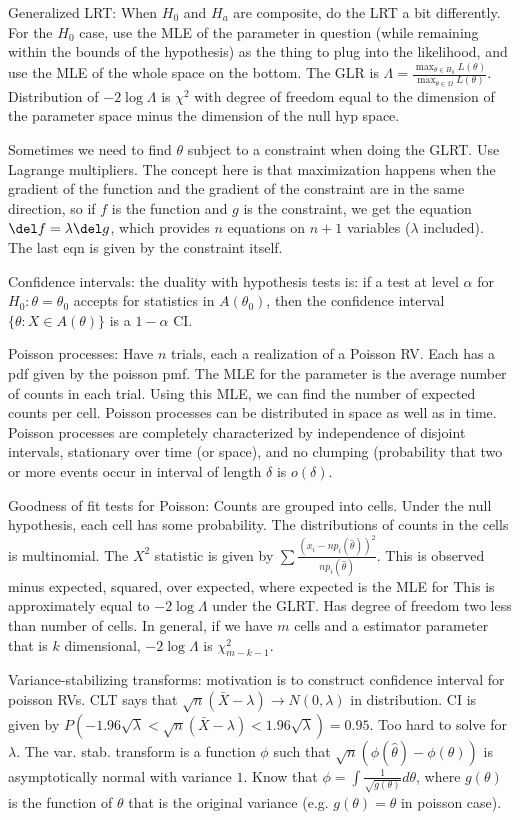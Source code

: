 \documentclass{article}
\begin{document}
Generalized LRT: When $H_0$ and $H_a$ are composite, do the LRT a bit differently. For the $H_0$ case, use the MLE of the parameter in question (while remaining within the bounds of the hypothesis) as the thing to plug into the likelihood, and use the MLE of the whole space on the bottom. The GLR is $\Lambda=\frac{\max_{\theta\in H_0}L(\theta)}{\max_{\theta\in\Omega}L(\theta)}$. Distribution of $-2\log\Lambda$ is $\chi^2$ with degree of freedom equal to the dimension of the parameter space minus the dimension of the null hyp space.

Sometimes we need to find $\theta$ subject to a constraint when doing the GLRT. Use Lagrange multipliers. The concept here is that maximization happens when the gradient of the function and the gradient of the constraint are in the same direction, so if $f$ is the function and $g$ is the constraint, we get the equation $\del f=\lambda\del g$, which provides $n$ equations on $n+1$ variables ($\lambda$ included). The last eqn is given by the constraint itself.

Confidence intervals: the duality with hypothesis tests is: if a test at level $\alpha$ for $H_0:\theta=\theta_0$ accepts for statistics in $A(\theta_0)$, then the confidence interval $\{\theta:X\in A(\theta)\}$ is a $1-\alpha$ CI.

Poisson processes: Have $n$ trials, each a realization of a Poisson RV. Each has a pdf given by the poisson pmf. The MLE for the parameter is the average number of counts in each trial. Using this MLE, we can find the number of expected counts per cell. Poisson processes can be distributed in space as well as in time. Poisson processes are completely characterized by independence of disjoint intervals, stationary over time (or space), and no clumping (probability that two or more events occur in interval of length $\delta$ is $o(\delta)$.

Goodness of fit tests for Poisson: Counts are grouped into cells. Under the null hypothesis, each cell has some probability. The distributions of counts in the cells is multinomial. The $X^2$ statistic is given by $\sum\frac{(x_i-np_i(\hat{\theta}))^2}{np_i(\hat{\theta})}$. This is observed minus expected, squared, over expected, where expected is the MLE for  This is approximately equal to $-2\log\Lambda$ under the GLRT. Has degree of freedom two less than number of cells. In general, if we have $m$ cells and a estimator parameter that is $k$ dimensional, $-2\log\Lambda$ is $\chi^2_{m-k-1}$. 

Variance-stabilizing transforms: motivation is to construct confidence interval for poisson RVs. CLT says that $\sqrt{n}(\bar{X}-\lambda)\to N(0,\lambda)$ in distribution. CI is given by $P(-1.96\sqrt{\lambda}<\sqrt{n}(\bar{X}-\lambda)<1.96\sqrt{\lambda})=0.95$. Too hard to solve for $\lambda$. The var. stab. transform is a function $\phi$ such that $\sqrt{n}(\phi(\hat{\theta})-\phi(\theta))$ is asymptotically normal with variance $1$. Know that $\phi=\int\frac{1}{\sqrt{g(\theta)}}d\theta$, where $g(\theta)$ is the function of $\theta$ that is the original variance (e.g. $g(\theta)=\theta$ in poisson case).
\end{document}

